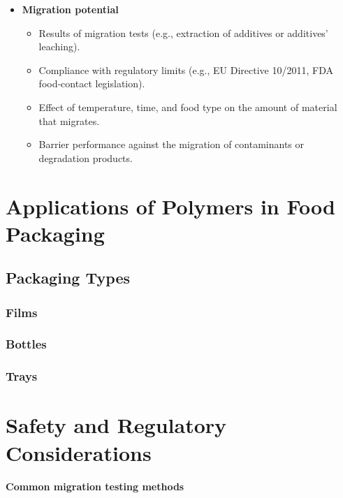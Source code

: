\documentclass[11pt,a4paper]{article}
\begin{document}
\begin{itemize}
\item 
\textbf{Migration potential}
  \begin{itemize}
\item Results of migration tests (e.g., extraction of additives or additives’ leaching).
\item Compliance with regulatory limits (e.g., EU Directive 10/2011, FDA food‑contact legislation).
\item Effect of temperature, time, and food type on the amount of material that migrates.
\item Barrier performance against the migration of contaminants or degradation products.
  \end{itemize}
\end{itemize}

\section{Applications of Polymers in Food Packaging}

\subsection{Packaging Types}

\subsubsection{Films}

\subsubsection{Bottles}

\subsubsection{Trays}

\section{Safety and Regulatory Considerations}

\textbf{Common migration testing methods}
\end{document}
